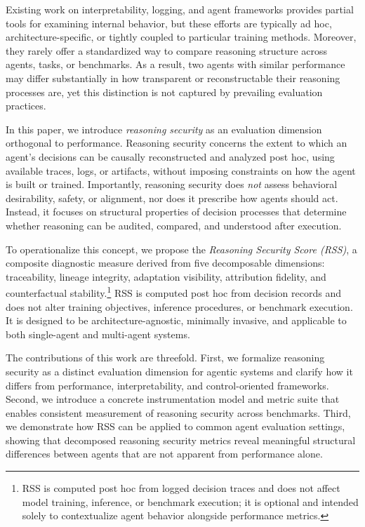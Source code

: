 \documentclass[11pt]{article}
\begin{document}
Existing work on interpretability, logging, and agent frameworks provides partial tools for examining internal behavior, but these efforts are typically ad hoc, architecture-specific, or tightly coupled to particular training methods. Moreover, they rarely offer a standardized way to compare reasoning structure across agents, tasks, or benchmarks. As a result, two agents with similar performance may differ substantially in how transparent or reconstructable their reasoning processes are, yet this distinction is not captured by prevailing evaluation practices.

In this paper, we introduce \emph{reasoning security} as an evaluation dimension orthogonal to performance. Reasoning security concerns the extent to which an agent’s decisions can be causally reconstructed and analyzed post hoc, using available traces, logs, or artifacts, without imposing constraints on how the agent is built or trained. Importantly, reasoning security does \emph{not} assess behavioral desirability, safety, or alignment, nor does it prescribe how agents should act. Instead, it focuses on structural properties of decision processes that determine whether reasoning can be audited, compared, and understood after execution.

To operationalize this concept, we propose the \emph{Reasoning Security Score (RSS)}, a composite diagnostic measure derived from five decomposable dimensions: traceability, lineage integrity, adaptation visibility, attribution fidelity, and counterfactual stability.\footnote{RSS is computed post hoc from logged decision traces and does not affect model training, inference, or benchmark execution; it is optional and intended solely to contextualize agent behavior alongside performance metrics.} RSS is computed post hoc from decision records and does not alter training objectives, inference procedures, or benchmark execution. It is designed to be architecture-agnostic, minimally invasive, and applicable to both single-agent and multi-agent systems.

The contributions of this work are threefold. First, we formalize reasoning security as a distinct evaluation dimension for agentic systems and clarify how it differs from performance, interpretability, and control-oriented frameworks. Second, we introduce a concrete instrumentation model and metric suite that enables consistent measurement of reasoning security across benchmarks. Third, we demonstrate how RSS can be applied to common agent evaluation settings, showing that decomposed reasoning security metrics reveal meaningful structural differences between agents that are not apparent from performance alone.
\end{document}
